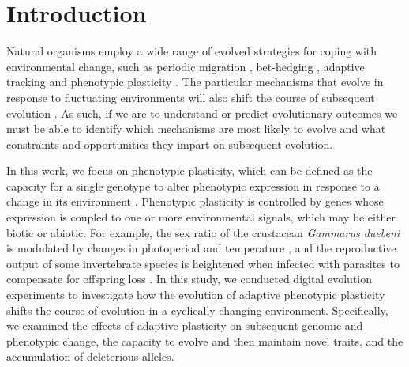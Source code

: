
\section{Introduction}

Natural organisms employ a wide range of evolved strategies for coping with environmental change, such as 
periodic migration \citep{winger_long_2019}, 
bet-hedging \citep{beaumont_experimental_2009}, 
adaptive tracking \citep{barrett_adaptation_2008}
and phenotypic plasticity \citep{ghalambor_adaptive_2007}.
The particular mechanisms that evolve in response to fluctuating environments will also shift the course of subsequent evolution \citep{wennersten_population-level_2012,schaum_plasticity_2014}.
As such, if we are to understand or predict evolutionary outcomes we must be able to identify which mechanisms are most likely to evolve and what constraints and opportunities they impart on subsequent evolution.

In this work, we focus on phenotypic plasticity, which can be defined as the capacity for a single genotype to alter phenotypic expression in response to a change in its environment \citep{west-eberhard_developmental_2003}. 
Phenotypic plasticity is controlled by genes whose expression is coupled to one or more environmental signals, which may be either biotic or abiotic. 
For example, the sex ratio of the crustacean \textit{Gammarus duebeni} is modulated by changes in photoperiod and temperature \citep{dunn_two_2005}, and the reproductive output of some invertebrate species is heightened when infected with parasites to compensate for offspring loss \citep{chadwick_parasite-mediated_2005}. 
In this study, we conducted digital evolution experiments to investigate how the evolution of adaptive phenotypic plasticity shifts the course of evolution in a cyclically changing environment.
Specifically, we examined the effects of adaptive plasticity on subsequent genomic and phenotypic change, the capacity to evolve and then maintain novel traits, and the accumulation of deleterious alleles.


